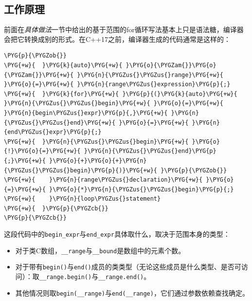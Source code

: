 
\subsection{工作原理}



前面在\textit{具体做法}一节中给出的基于范围的for循环写法基本上只是语法糖，编译器会把它转换成别的形式。在C++17之前，编译器生成的代码通常是这样的：



\begin{codeblockbg}
\begin{Verbatim}[commandchars=\\\{\},breaklines=true,breakanywhere=true,fontsize=\codefont,xleftmargin=17bp]
\PYG{p}{\PYGZob{}}
\PYG{+w}{  }\PYG{k}{auto}\PYG{+w}{ }\PYG{o}{\PYGZam{}}\PYG{o}{\PYGZam{}}\PYG{+w}{ }\PYG{n}{\PYGZus{}\PYGZus{}range}\PYG{+w}{ }\PYG{o}{=}\PYG{+w}{ }\PYG{n}{range\PYGZus{}expression}\PYG{p}{;}
\PYG{+w}{  }\PYG{k}{for}\PYG{+w}{ }\PYG{p}{(}\PYG{k}{auto}\PYG{+w}{ }\PYG{n}{\PYGZus{}\PYGZus{}begin}\PYG{+w}{ }\PYG{o}{=}\PYG{+w}{ }\PYG{n}{begin\PYGZus{}expr}\PYG{p}{,}\PYG{+w}{ }\PYG{n}{\PYGZus{}\PYGZus{}end}\PYG{+w}{ }\PYG{o}{=}\PYG{+w}{ }\PYG{n}{end\PYGZus{}expr}\PYG{p}{;}
\PYG{+w}{  }\PYG{n}{\PYGZus{}\PYGZus{}begin}\PYG{+w}{ }\PYG{o}{!}\PYG{o}{=}\PYG{+w}{ }\PYG{n}{\PYGZus{}\PYGZus{}end}\PYG{p}{;}\PYG{+w}{ }\PYG{o}{+}\PYG{o}{+}\PYG{n}{\PYGZus{}\PYGZus{}begin}\PYG{p}{)}\PYG{+w}{ }\PYG{p}{\PYGZob{}}
\PYG{+w}{    }\PYG{n}{range\PYGZus{}declaration}\PYG{+w}{ }\PYG{o}{=}\PYG{+w}{ }\PYG{o}{*}\PYG{n}{\PYGZus{}\PYGZus{}begin}\PYG{p}{;}
\PYG{+w}{    }\PYG{n}{loop\PYGZus{}statement}
\PYG{+w}{  }\PYG{p}{\PYGZcb{}}
\PYG{p}{\PYGZcb{}}
\end{Verbatim}
\end{codeblockbg}



这段代码中的\texttt{begin\_\allowbreak{}expr}与\texttt{end\_\allowbreak{}expr}具体取什么，取决于范围本身的类型：



\begin{itemize}
\item 对于类C数组，\texttt{\_\_\allowbreak{}range}与\texttt{\_\_\allowbreak{}bound}是数组中的元素个数。



\item 对于带有\texttt{begin()}与\texttt{end()}成员的类类型（无论这些成员是什么类型、是否可访问）：取\texttt{\_\_\allowbreak{}range.\allowbreak{}begin()}与\texttt{\_\_\allowbreak{}range.\allowbreak{}end()}。



\item 其他情况则取\texttt{begin(\_\_\allowbreak{}range)}与\texttt{end(\_\_\allowbreak{}range)}，它们通过参数依赖查找确定。

\end{itemize}


